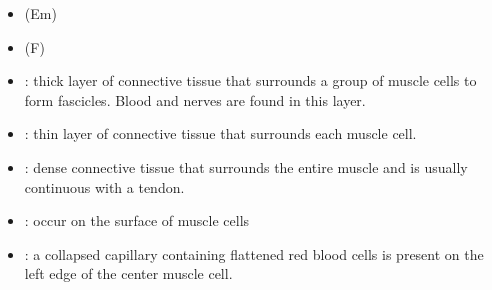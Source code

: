 \begin{itemize}
\begin{multicols}{2}
\begin{itemize}
  \item {} (Em)

   \begin{center}
  \end{center}

  \item {} (F)

   \begin{center}
  \end{center}

  \vspace{20pt}

  \item {}: thick layer of connective tissue that surrounds a group of muscle cells to form fascicles. Blood and nerves are found in this layer.

   \begin{center}
  \end{center}

  \item {}: thin layer of connective tissue that surrounds each muscle cell.

   \begin{center}
  \end{center}

  \item {}: dense connective tissue that surrounds the entire muscle and is usually continuous with a tendon.

   \begin{center}
  \end{center}

  \vspace{60pt}

  \item {}: occur on the surface of muscle cells

   \begin{center}
  \end{center}

  \item {}: a collapsed capillary containing flattened red blood cells is present on the left edge of the center muscle cell.


\end{itemize}
\end{multicols}
\end{itemize}

